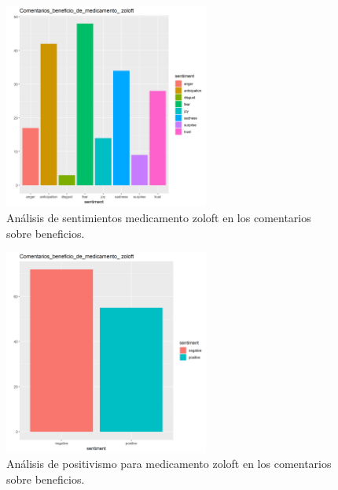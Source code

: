 \documentclass[spanish,]{article}
\begin{document}
\begin{figure}[h]
    \centering
    \includegraphics[width=0.6\textwidth]{figuras/sentimientos/Azoloft1.png}
    \caption{Análisis de sentimientos medicamento zoloft en los comentarios sobre beneficios.}
    \label{fig:sentimientos:44}
\end{figure}

\begin{figure}[h]
    \centering
    \includegraphics[width=0.6\textwidth]{figuras/sentimientos/Azoloft2.png}
    \caption{Análisis de positivismo para medicamento zoloft en los comentarios sobre beneficios.}
    \label{fig:sentimientos:45}
\end{figure}
\end{document}
